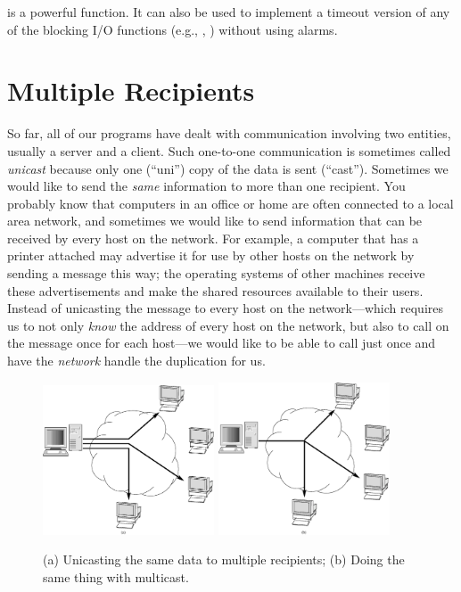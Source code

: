 \noindent {} is a powerful function.  It can
also be used to implement a timeout version of any of the blocking I/O
functions (e.g., ,
) without using alarms.

\section{Multiple Recipients}

So far, all of our programs have dealt with communication involving
two entities, usually a server and a client.  Such one-to-one
communication is sometimes called \emph{unicast} because only one
(``uni'') copy
of the data is sent (``cast'').  Sometimes we would
like to send the \emph{same\/} information to more than one
recipient.  You probably know that computers in an office or home are often
connected to a local area network, and sometimes we would like to
send information that can be received by every host on
the network.  For example, a computer that has a printer attached
may advertise it for use by other hosts on the network
by sending a message this way;
the operating systems of other machines receive these advertisements
and make the shared resources available to their users.
Instead of unicasting the message to every host on the
network---which requires us to not only \emph{know\/} the address of every host
on the network, but also to call  on the message once for
each host---we would like to be able to call  just
once and have the \emph{network\/} handle the duplication for us.

\begin{figure}[htb]
\begin{center}
\includegraphics[width=2in]{figures/uniuni.eps}
\hspace{1in}
\includegraphics[width=2in]{figures/unimulti.eps}
\caption{(a) Unicasting the same data to multiple recipients; (b)
Doing the same thing with multicast.\label{unimulti}}
\end{center}
\end{figure}

